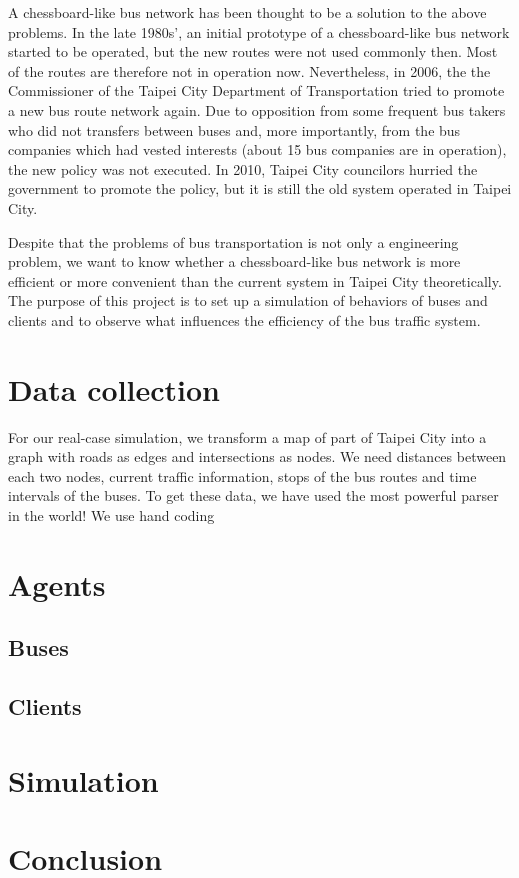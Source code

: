 \documentclass{sig-alternate}
\begin{document}
A chessboard-like bus network has been thought to be a solution to the above problems.
In the late 1980s', an initial prototype of a chessboard-like bus network started to be operated, but the new routes were not used commonly then.
Most of the routes are therefore not in operation now.
Nevertheless, in 2006, the the Commissioner of the Taipei City Department of Transportation tried to promote a new bus route network again.
Due to opposition from some frequent bus takers who did not transfers between buses and, more importantly, from the bus companies which had vested interests (about 15 bus companies are in operation), the new policy was not executed.
In 2010, Taipei City councilors hurried the government to promote the policy, but it is still the old system operated in Taipei City.

Despite that the problems of bus transportation is not only a engineering problem, we want to know whether a chessboard-like bus network is more efficient or more convenient than the current system in Taipei City theoretically.
The purpose of this project is to set up a simulation of behaviors of buses and clients and to observe what influences the efficiency of the bus traffic system.

\section{Data collection}
For our real-case simulation, we transform a map of part of Taipei City into a graph with roads as edges and intersections as nodes.
We need distances between each two nodes, current traffic information, stops of the bus routes and time intervals of the buses.
To get these data, we have used the most powerful parser in the world!
We use hand coding

\section{Agents}
\subsection{Buses}
\subsection{Clients}

\section{Simulation}

\section{Conclusion}
\end{document}
